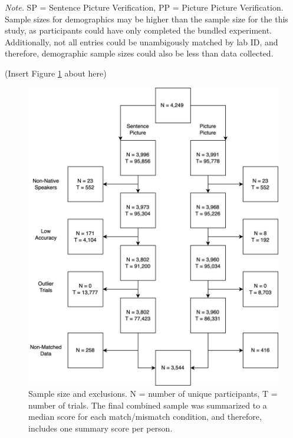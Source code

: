 \documentclass[
  man,floatsintext]{apa7}
\begin{document}
\begin{table}[tbp]
\begin{center}
\begin{threeparttable}
{}

\begin{tablenotes}[para]
\normalsize{\textit{Note.} SP = Sentence Picture Verification, PP = Picture Picture Verification. Sample sizes for demographics may be higher than the sample size for the this study, as participants could have only completed the bundled experiment. Additionally, not all entries could be unambigously matched by lab ID, and therefore, demographic sample sizes could also be less than data collected.}
\end{tablenotes}

\end{threeparttable}
\end{center}

\end{table}

(Insert Figure \ref{fig:sample-fig} about here)

\begin{figure}
\includegraphics[width=5.71in]{includes/fig/psa002_flow.drawio} \caption{Sample size and exclusions. N = number of unique participants, T = number of trials. The final combined sample was summarized to a median score for each match/mismatch condition, and therefore, includes one summary score per person.}\label{fig:sample-fig}
\end{figure}
\end{document}

